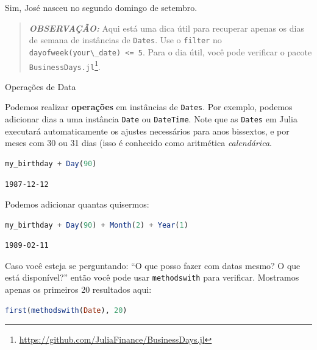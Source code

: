 \documentclass[
  notoc %
]{tufte-book}
\makeatletter
\DeclareRobustCommand{\href}[2]{#2\footnote{\url{#1}}}
\newcommand{\passthrough}[1]{#1}
\renewcommand\subsubsection{%
\@startsection{subsubsection}{3}{\z@ }{-3.25ex\@plus -1ex \@minus -.2ex}{1.5ex \@plus .2ex}{\normalfont \normalsize \bfseries }
}
\makeatother
\begin{document}
Sim, José nasceu no segundo domingo de setembro.

\begin{quote}
\textbf{\emph{OBSERVAÇÃO:}} Aqui está uma dica útil para recuperar
apenas os dias de semana de instâncias de
\passthrough{\lstinline!Dates!}. Use o \passthrough{\lstinline!filter!}
no \passthrough{\lstinline!dayofweek(your\_date) <= 5!}. Para o dia
útil, você pode verificar o pacote
\href{https://github.com/JuliaFinance/BusinessDays.jl}{\passthrough{\lstinline!BusinessDays.jl!}}.
\end{quote}

\hypertarget{sec:dates_operations}{%
\subsubsection{Operações de Data}\label{sec:dates_operations}}

Podemos realizar \textbf{operações} em instâncias de
\passthrough{\lstinline!Dates!}. Por exemplo, podemos adicionar dias a
uma instância \passthrough{\lstinline!Date!} ou
\passthrough{\lstinline!DateTime!}. Note que as
\passthrough{\lstinline!Dates!} em Julia executará automaticamente os
ajustes necessários para anos bissextos, e por meses com 30 ou 31 dias
(isso é conhecido como aritmética \emph{calendárica}.

\begin{lstlisting}[language=Julia]
my_birthday + Day(90)
\end{lstlisting}

\begin{lstlisting}[language=Output]
1987-12-12
\end{lstlisting}

Podemos adicionar quantas quisermos:

\begin{lstlisting}[language=Julia]
my_birthday + Day(90) + Month(2) + Year(1)
\end{lstlisting}

\begin{lstlisting}[language=Output]
1989-02-11
\end{lstlisting}

Caso você esteja se perguntando: ``O que posso fazer com datas mesmo? O
que está disponível?'' então você pode usar
\passthrough{\lstinline!methodswith!} para verificar. Mostramos apenas
os primeiros 20 resultados aqui:

\begin{lstlisting}[language=Julia]
first(methodswith(Date), 20)
\end{lstlisting}
\end{document}
